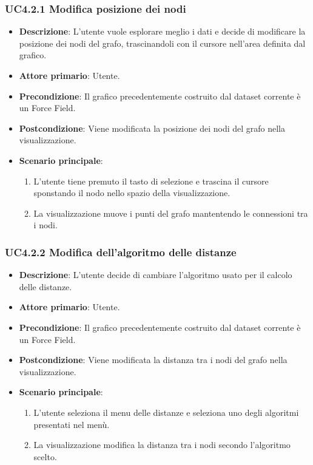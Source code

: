 \subsubsection{UC4.2.1 Modifica posizione dei nodi}
\label{subsec:uc4.2.1}
\begin{itemize}
    \item \textbf{Descrizione}: L’utente vuole esplorare meglio i dati e decide di 
                                modificare la posizione dei nodi del grafo, trascinandoli con il 
                                cursore nell'area definita dal grafico.
	
    \item \textbf{Attore primario}: Utente.
    
    \item \textbf{Precondizione}:   Il grafico precedentemente costruito dal dataset corrente è un Force Field.
    \item \textbf{Postcondizione}:  Viene modificata la posizione dei nodi del grafo nella visualizzazione.

	\item \textbf{Scenario principale}:
        \begin{enumerate}
            \item L'utente tiene premuto il tasto di selezione e trascina il cursore sponstando il nodo nello spazio della visualizzazione.
            \item La visualizzazione muove i punti del grafo mantentendo le connessioni tra i nodi.
        \end{enumerate}
\end{itemize}

\subsubsection{UC4.2.2 Modifica dell'algoritmo delle distanze}
\label{subsec:uc4.2.2}
\begin{itemize}
    \item \textbf{Descrizione}: L’utente decide di cambiare l’algoritmo usato per il calcolo delle distanze.

	
    \item \textbf{Attore primario}: Utente.
    
    \item \textbf{Precondizione}:   Il grafico precedentemente costruito dal dataset corrente è un Force Field.
    \item \textbf{Postcondizione}:  Viene modificata la distanza tra i nodi del grafo nella visualizzazione.

	\item \textbf{Scenario principale}:
        \begin{enumerate}
            \item L'utente seleziona il menu delle distanze e seleziona uno degli algoritmi presentati nel menù.
            \item La visualizzazione modifica la distanza tra i nodi secondo l'algoritmo scelto.
        \end{enumerate}
\end{itemize}

